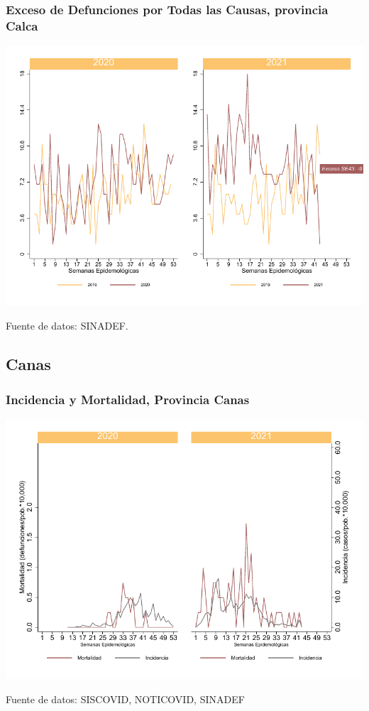 \documentclass[xcolor=table]{beamer}
\begin{document}
\begin{frame}
	\frametitle{Exceso de Defunciones por Todas las Causas, provincia Calca}
	\vspace{-.5cm}
	\begin{center}
		\includegraphics[width=0.8\linewidth, trim={0cm .5cm 0cm 0.2cm},clip]{../figuras/exceso_3.pdf}
	\end{center}
	{\tiny Fuente de datos: SINADEF.}
	
	\hyperlink{indicadores_provinciales}{}
\end{frame}

\subsection{Canas}

\begin{frame}[label=Canas]
	\frametitle{Incidencia y Mortalidad, Provincia Canas}
	\vspace{-.5cm}
	\begin{center}
		\includegraphics[width=0.8\linewidth, trim={0cm .5cm 0cm 0.2cm},clip]{../figuras/incidencia_mortalidad_20_21_4.pdf}
	\end{center}
	{\tiny Fuente de datos: SISCOVID, NOTICOVID, SINADEF}
\end{frame}
\end{document}

